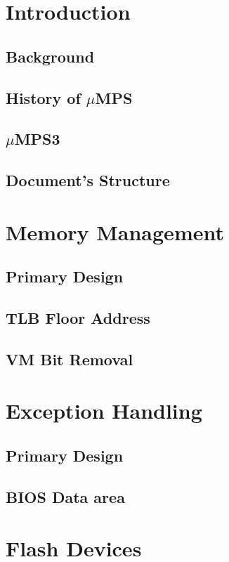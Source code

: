 \documentclass[12pt,a4paper,openright,twoside]{report}
\begin{document}
\chapter{Introduction}
\lhead[\fancyplain{}{\bfseries\thepage}]{\fancyplain{}{\bfseries\rightmark}}
\section{Background}
\section{History of $\mu$MPS}
\section{$\mu$MPS3}
\section{Document's Structure}
\chapter{Memory Management}
\lhead[\fancyplain{}{\bfseries\thepage}]{\fancyplain{}{\bfseries\rightmark}}
\section{Primary Design}
\section{TLB Floor Address}
\section{VM Bit Removal}
\chapter{Exception Handling}
\lhead[\fancyplain{}{\bfseries\thepage}]{\fancyplain{}{\bfseries\rightmark}}
\section{Primary Design}
\section{BIOS Data area}
\lhead[\fancyplain{}{\bfseries\thepage}]{\fancyplain{}{\bfseries\rightmark}}
\chapter{Flash Devices}
\lhead[\fancyplain{}{\bfseries\thepage}]{\fancyplain{}{\bfseries\rightmark}}
\end{document}

